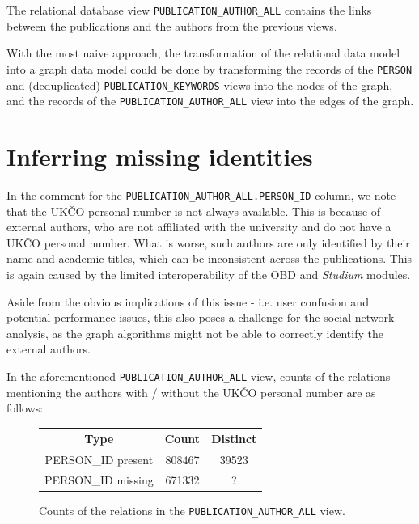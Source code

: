 The relational database view \texttt{PUBLICATION\_AUTHOR\_ALL} contains the links between the publications and the authors from the previous views.

With the most naive approach, the transformation of the relational data model into a graph data model could be done by transforming the records of the 
\texttt{PERSON} and (deduplicated) \texttt{PUBLICATION\_KEYWORDS} views into the nodes of the graph, 
and the records of the \texttt{PUBLICATION\_AUTHOR\_ALL} view into the edges of the graph.

\section{Inferring missing identities}

    In the \hyperref[sec:pub-author-all]{comment} for the \texttt{PUBLICATION\_AUTHOR\_ALL.PERSON\_ID} column, we note that the \ac{UKČO} personal number is not always available.
    This is because of external authors, who are not affiliated with the university and do not have a \ac{UKČO} personal number.
What is worse, such authors are only identified by their name and academic titles, which can be inconsistent across the publications.
This is again caused by the limited interoperability of the \ac{OBD} and \textit{Studium} modules.

Aside from the obvious implications of this issue - i.e. user confusion and potential performance issues,
this also poses a challenge for the social network analysis, as the graph algorithms might not be able 
to correctly identify the external authors.

    In the aforementioned \texttt{PUBLICATION\_AUTHOR\_ALL} view, counts of the relations mentioning the authors with / without the \ac{UKČO} personal number are as follows:

\begin{figure}[!ht]
    \captionsetup{width=.9\linewidth}
    \centering
    \begin{tabular}{|c|c|c|}
    \hline
        Type & Count & Distinct \\ \hline
        PERSON\_ID present & 808467 & 39523 \\ \hline
        PERSON\_ID missing & 671332 & ? \\ \hline
    \end{tabular}
    \caption{Counts of the relations in the \texttt{PUBLICATION\_AUTHOR\_ALL} view.}
\end{figure}

